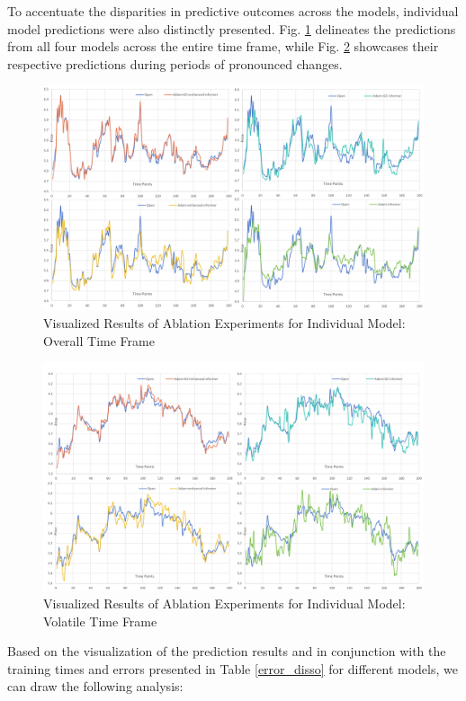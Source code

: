 \documentclass[sn-mathphys,Numbered]{sn-jnl}
\theoremstyle{thmstyleone}%
\theoremstyle{thmstyletwo}%
\theoremstyle{thmstylethree}%
\begin{document}
To accentuate the disparities in predictive outcomes across the models, individual model predictions were also distinctly presented. Fig. \ref{disso_all} delineates the predictions from all four models across the entire time frame, while Fig. \ref{disso_part} showcases their respective predictions during periods of pronounced changes.

\begin{figure}[h]
    \centering
    \includegraphics[width=1\textwidth]{pngs/disso_all.png}
    \caption{ Visualized Results of Ablation Experiments for Individual Model: Overall Time Frame}
    \label{disso_all}
\end{figure}

\begin{figure}[h]
    \centering
    \includegraphics[width=1\textwidth]{pngs/disso_part.png}
    \caption{ Visualized Results of Ablation Experiments for Individual Model: Volatile Time Frame}
    \label{disso_part}
\end{figure}

Based on the visualization of the prediction results and in conjunction with the training times and errors presented in Table \ref{error_disso} for different models, we can draw the following analysis:
\end{document}
